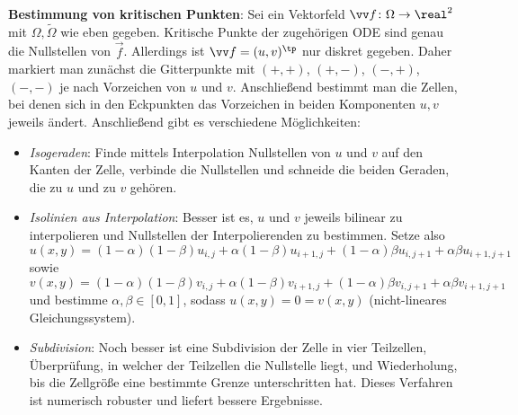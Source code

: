 \textbf{Bestimmung von kritischen Punkten}:
Sei ein Vektorfeld $\vec{f}\colon \Omega \to \real^2$ mit $\Omega, \widetilde{\Omega}$ wie eben
gegeben.
Kritische Punkte der zugehörigen ODE sind genau die Nullstellen von $\vec{f}$.
Allerdings ist $\vec{f} = (u, v)^\tp$ nur diskret gegeben.
Daher markiert man zunächst die Gitterpunkte mit $(+,+)$, $(+,-)$, $(-,+)$, $(-,-)$ je nach
Vorzeichen von $u$ und $v$.
Anschließend bestimmt man die Zellen, bei denen sich in den Eckpunkten das Vorzeichen in
beiden Komponenten $u, v$ jeweils ändert.
Anschließend gibt es verschiedene Möglichkeiten:
\begin{itemize}
    \item
    \emph{Isogeraden}:
    Finde mittels Interpolation Nullstellen von $u$ und $v$ auf den Kanten der Zelle,
    verbinde die Nullstellen und schneide die beiden Geraden, die zu $u$ und zu $v$ gehören.

    \item
    \emph{Isolinien aus Interpolation}:
    Besser ist es, $u$ und $v$ jeweils bilinear zu interpolieren und
    Nullstellen der Interpolierenden zu bestimmen.
    Setze also\\
    $u(x, y) = (1-\alpha)(1-\beta) u_{i,j} + \alpha(1-\beta) u_{i+1,j} +
    (1-\alpha)\beta u_{i,j+1} + \alpha\beta u_{i+1,j+1}$ sowie\\
    $v(x, y) = (1-\alpha)(1-\beta) v_{i,j} + \alpha(1-\beta) v_{i+1,j} +
    (1-\alpha)\beta v_{i,j+1} + \alpha\beta v_{i+1,j+1}$ und
    bestimme $\alpha, \beta \in [0, 1]$, sodass $u(x, y) = 0 = v(x, y)$
    (nicht-lineares Gleichungssystem).

    \item
    \emph{Subdivision}:
    Noch besser ist eine Subdivision der Zelle in vier Teilzellen,
    Überprüfung, in welcher der Teilzellen die Nullstelle liegt, und Wiederholung,
    bis die Zellgröße eine bestimmte Grenze unterschritten hat.
    Dieses Verfahren ist numerisch robuster und liefert bessere Ergebnisse.
\end{itemize}

\linie

